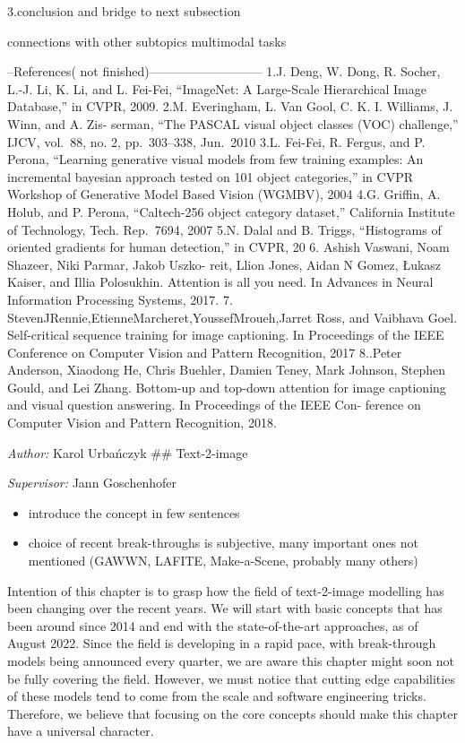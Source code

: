 \documentclass[
]{krantz}
\providecommand{\tightlist}{%
  \setlength{\itemsep}{0pt}\setlength{\parskip}{0pt}}
\begin{document}
3.conclusion and bridge to next subsection

connections with other subtopics
multimodal tasks

--References( not finished)---------------------------
1.J. Deng, W. Dong, R. Socher, L.-J. Li, K. Li, and L. Fei-Fei, ``ImageNet: A Large-Scale Hierarchical Image Database,'' in CVPR, 2009.
2.M. Everingham, L. Van Gool, C. K. I. Williams, J. Winn, and A. Zis- serman, ``The PASCAL visual object classes (VOC) challenge,'' IJCV, vol.~88, no. 2, pp.~303--338, Jun.~2010
3.L. Fei-Fei, R. Fergus, and P. Perona, ``Learning generative visual models from few training examples: An incremental bayesian approach tested on 101 object categories,'' in CVPR Workshop of Generative Model Based Vision (WGMBV), 2004
4.G. Griffin, A. Holub, and P. Perona, ``Caltech-256 object category dataset,'' California Institute of Technology, Tech. Rep.~7694, 2007
5.N. Dalal and B. Triggs, ``Histograms of oriented gradients for
human detection,'' in CVPR, 20
6. Ashish Vaswani, Noam Shazeer, Niki Parmar, Jakob Uszko- reit, Llion Jones, Aidan N Gomez, Łukasz Kaiser, and Illia Polosukhin. Attention is all you need. In Advances in Neural Information Processing Systems, 2017.
7. StevenJRennie,EtienneMarcheret,YoussefMroueh,Jarret Ross, and Vaibhava Goel. Self-critical sequence training for image captioning. In Proceedings of the IEEE Conference on Computer Vision and Pattern Recognition, 2017
8..Peter Anderson, Xiaodong He, Chris Buehler, Damien Teney, Mark Johnson, Stephen Gould, and Lei Zhang. Bottom-up and top-down attention for image captioning and visual question answering. In Proceedings of the IEEE Con- ference on Computer Vision and Pattern Recognition, 2018.

\emph{Author:} Karol Urbańczyk
\#\# Text-2-image

\emph{Supervisor:} Jann Goschenhofer

\begin{itemize}
\tightlist
\item
  introduce the concept in few sentences
\item
  choice of recent break-throughs is subjective, many important ones not mentioned (GAWWN, LAFITE, Make-a-Scene, probably many others)
\end{itemize}

Intention of this chapter is to grasp how the field of text-2-image modelling has been changing over the recent years. We will start with basic concepts that has been around since 2014 and end with the state-of-the-art approaches, as of August 2022. Since the field is developing in a rapid pace, with break-through models being announced every quarter, we are aware this chapter might soon not be fully covering the field. However, we must notice that cutting edge capabilities of these models tend to come from the scale and software engineering tricks. Therefore, we believe that focusing on the core concepts should make this chapter have a universal character.
\end{document}
